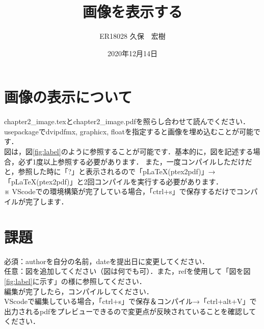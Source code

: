 \documentclass[a4paper,10pt]{jsarticle}
\title{画像を表示する}%
\author{ER18028 久保　宏樹}%
\date{2020年12月14日}%
\begin{document}
\maketitle%
\section{画像の表示について}
chapter2\_image.texとchapter2\_image.pdfを照らし合わせて読んでください．\\

usepackageでdvipdfmx, graphicx, floatを指定すると画像を埋め込むことが可能です．\\

図は，図\ref{fig:label}のように参照することが可能です．基本的に，図を記述する場合，必ず1度以上参照する必要があります．
また，一度コンパイルしただけだと，参照した時に「?」と表示されるので「pLaTeX(ptex2pdf)」→「pLaTeX(ptex2pdf)」と2回コンパイルを実行する必要があります．\\
※ VScodeでの環境構築が完了している場合，「ctrl+s」で保存するだけでコンパイルが完了します．


\section{課題}
\noindent 必須：authorを自分の名前，dateを提出日に変更してください．\\
任意：図を追加してください（図は何でも可）．また，refを使用して「図を図\ref{fig:label}に示す」の様に参照してください．\\

\noindent 編集が完了したら，コンパイルしてください．\\
VScodeで編集している場合，「ctrl+s」で保存＆コンパイル→「ctrl+alt+V」で出力されるpdfをプレビューできるので変更点が反映されていることを確認してください．
\end{document}
